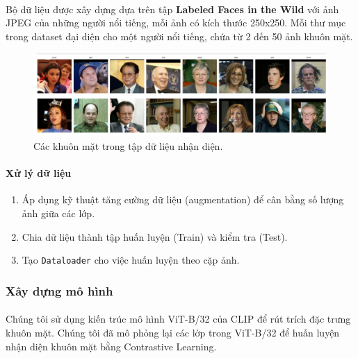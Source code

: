 {\paragraph{} {Bộ dữ liệu được xây dựng dựa trên tập \textbf{Labeled Faces in the Wild} với ảnh JPEG của những người nổi tiếng, mỗi ảnh có kích thước 250x250. Mỗi thư mục trong dataset đại diện cho một người nổi tiếng, chứa từ 2 đến 50 ảnh khuôn mặt.}

\begin{figure}[h!]
    \centering
    \includegraphics[width=1\textwidth]{img/05-Face.png}
    \caption{Các khuôn mặt trong tập dữ liệu nhận diện.}
    \label{fig:example_face}
\end{figure}


\paragraph{Xử lý dữ liệu}
\begin{enumerate}
    \item Áp dụng kỹ thuật tăng cường dữ liệu (augmentation) để cân bằng số lượng ảnh giữa các lớp.
    \item Chia dữ liệu thành tập huấn luyện (Train) và kiểm tra (Test).
    \item Tạo \texttt{Dataloader} cho việc huấn luyện theo cặp ảnh.
\end{enumerate}

\subsubsection{Xây dựng mô hình}

\paragraph{}{Chúng tôi sử dụng kiến trúc mô hình ViT-B/32 của CLIP để rút trích đặc trưng khuôn mặt. Chúng tôi đã mô phỏng lại các lớp trong ViT-B/32 để huấn luyện nhận diện khuôn mặt bằng Contrastive Learning.}

}
